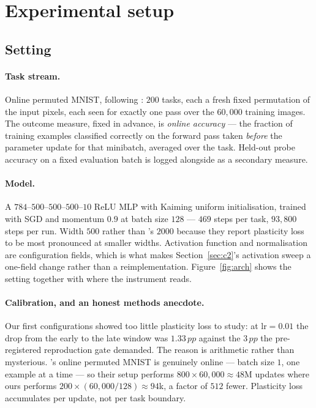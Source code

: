 \documentclass[10pt]{article}
\newcommand{\pp}{\,pp}
\begin{document}
\section{Experimental setup}
\label{sec:setup}

\subsection{Setting}

\paragraph{Task stream.} Online permuted MNIST, following
\citet{dohare2024loss}: $200$ tasks, each a fresh fixed permutation of the input
pixels, each seen for exactly one pass over the $60{,}000$ training images. The
outcome measure, fixed in advance, is \emph{online accuracy} --- the fraction of
training examples classified correctly on the forward pass taken \emph{before}
the parameter update for that minibatch, averaged over the task. Held-out probe
accuracy on a fixed evaluation batch is logged alongside as a secondary measure.

\paragraph{Model.} A $784$--$500$--$500$--$500$--$10$ ReLU MLP with Kaiming
uniform initialisation, trained with SGD and momentum $0.9$ at batch size $128$
--- $469$ steps per task, $93{,}800$ steps per run.  Width $500$ rather than
\citeauthor{dohare2024loss}'s $2000$ because they report plasticity loss to be
most pronounced at smaller widths. Activation function and normalisation are
configuration fields, which is what makes Section~\ref{sec:c2}'s activation
sweep a one-field change rather than a reimplementation. Figure~\ref{fig:arch}
shows the setting together with where the instrument reads.



\paragraph{Calibration, and an honest methods anecdote.}
Our first configurations showed too little plasticity loss to study: at
$\text{lr}=0.01$ the drop from the early to the late window was $1.33\pp$
against the $3\pp$ the pre-registered reproduction gate demanded. The reason is
arithmetic rather than mysterious. \citeauthor{dohare2024loss}'s online permuted
MNIST is genuinely online --- batch size $1$, one example at a time --- so their
setup performs $800 \times 60{,}000 \approx 48$M updates where ours performs
$200 \times (60{,}000/128) \approx 94$k, a factor of $512$ fewer. Plasticity loss
accumulates per update, not per task boundary.
\end{document}
